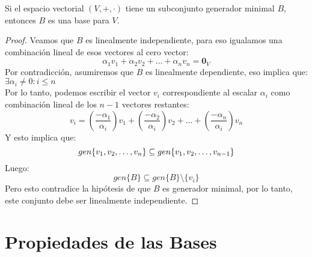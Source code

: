 \begin{theorem}
Si el espacio vectorial $(V , + , \cdot)$ tiene un subconjunto generador minimal $B$, entonces $B$ es una base para $V$.
\end{theorem}
\begin{proof}
Veamos que $B$ es linealmente independiente, para eso igualamos una combinación lineal de esos vectores al cero vector:
$$\alpha_1 v_1 + \alpha_2  v_2 + \hdots + \alpha_n v_n = \mathbf{0}_V $$
Por contradicción, asumiremos que $B$ es linealmente dependiente, eso implica que: $\exists \alpha_i \neq 0: i \leq n$\\
Por lo tanto, podemos escribir el vector $v_i$ correspondiente al escalar $\alpha_i$ como combinación lineal de los $n-1$ vectores restantes:
$$v_i = \left( \frac{-\alpha_1}{\alpha_i} \right)v_1 + \left( \frac{-\alpha_2}{\alpha_i} \right)v_2 + \hdots + \left( \frac{-\alpha_n}{\alpha_i} \right)v_n$$
Y esto implica que: 
$$gen \lbrace v_1, v_2, \ldots, v_n \rbrace \subseteq gen \lbrace v_1, v_2, \ldots, v_{n-1} \rbrace$$
Luego:
$$gen\{B\} \subseteq gen\{B\} \setminus \{v_i\}$$
Pero esto contradice la hipótesis de que $B$ es generador minimal, por lo tanto, este conjunto debe ser linealmente independiente.

\end{proof}


\section{Propiedades de las Bases}
%


%
%


